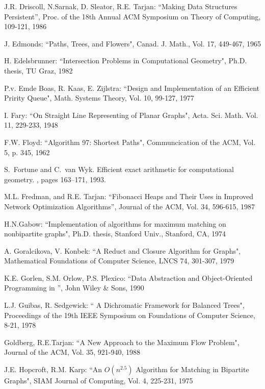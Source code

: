 \begin{thebibliography}{99}
{J.R. Driscoll, N.Sarnak, D. Sleator, R.E. Tarjan:
``Making Data Structures Persistent'', Proc. of the 18th Annual ACM 
Symposium on Theory of Computing, 109-121, 1986}

{J. Edmonds: ``Paths, Trees, and Flowers", Canad. J. Math., Vol. 17, 449-467,
1965}

{H. Edelsbrunner: ``Intersection Problems in Computational Geometry",
Ph.D. thesis, TU Graz, 1982}

{P.v. Emde Boas, R. Kaas, E. Zijlstra: ``Design and Implementation of an 
 Efficient Pririty Queue", Math. Systems Theory, Vol. 10, 99-127, 1977}

{I. Fary: ``On Straight Line Representing of Planar Graphs", Acta. Sci. Math.
 Vol. 11, 229-233, 1948}

{F.W. Floyd: ``Algorithm 97: Shortest Paths", Communcication of the ACM,
 Vol. 5, p. 345, 1962}

S.~Fortune and C.~{van Wyk}.
\newblock Efficient exact arithmetic for computational geometry.
, pages
  163--171, 1993.

{M.L. Fredman, and R.E. Tarjan: ``Fibonacci Heaps and Their Uses in
 Improved Network Optimization Algorithms'', Journal of the ACM, Vol. 34, 
 596-615, 1987}

{H.N.Gabow: 
``Implementation of algorithms for maximum matching on nonbipartite
 graphs", 
Ph.D. thesis, Stanford Univ., Stanford, CA, 1974}

{A. Goralcikova, V. Konbek: ``A Reduct and Closure Algorithm for Graphs",
 Mathematical Foundations of Computer Science, LNCS 74, 301-307, 1979}

{K.E. Gorlen, S.M. Orlow, P.S. Plexico: ``Data Abstraction and Object-Oriented
Programming in \CC'', John Wiley \& Sons, 1990}

{L.J. Guibas, R. Sedgewick: `` A Dichromatic Framework for Balanced Trees",
 Proceedings of the 19th IEEE Symposium on Foundations of Computer Science,
 8-21, 1978}

{Goldberg, R.E.Tarjan: ``A New Approach to the Maximum Flow Problem",
 Journal of the ACM, Vol. 35, 921-940, 1988 }

{J.E. Hopcroft, R.M. Karp: ``An $O(n^{2.5})$ Algorithm for Matching in 
 Bipartite Graphs", SIAM Journal of Computing, Vol. 4, 225-231, 1975}


\end{thebibliography}
